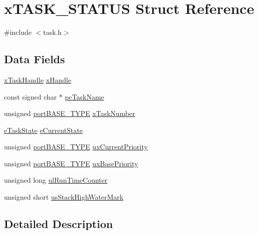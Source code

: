 \hypertarget{structxTASK__STATUS}{}\section{x\+T\+A\+S\+K\+\_\+\+S\+T\+A\+T\+US Struct Reference}
\label{structxTASK__STATUS}


{\ttfamily \#include $<$task.\+h$>$}

\subsection*{Data Fields}
\begin{DoxyCompactItemize}
\item 
\hyperlink{task_8h_a271ae40d5db07d928a113766505a0965}{x\+Task\+Handle} \hyperlink{structxTASK__STATUS_a16b862ad7f2460c2575d14350b5e7270}{x\+Handle}
\item 
const signed char $\ast$ \hyperlink{structxTASK__STATUS_a0b00a968685528cecb83b8d7f22b7863}{pc\+Task\+Name}
\item 
unsigned \hyperlink{portmacro_8h_a1ebe82d24d764ae4e352f7c3a9f92c01}{port\+B\+A\+S\+E\+\_\+\+T\+Y\+PE} \hyperlink{structxTASK__STATUS_a14a06c8bd78b7f60f9395593ac06b286}{x\+Task\+Number}
\item 
\hyperlink{task_8h_a1749369458e2282a22e862a619a3892c}{e\+Task\+State} \hyperlink{structxTASK__STATUS_a727e904e3afe49472b0fc6a4e96439cb}{e\+Current\+State}
\item 
unsigned \hyperlink{portmacro_8h_a1ebe82d24d764ae4e352f7c3a9f92c01}{port\+B\+A\+S\+E\+\_\+\+T\+Y\+PE} \hyperlink{structxTASK__STATUS_a381d967bd2222b5cb98efa708ae8a4d3}{ux\+Current\+Priority}
\item 
unsigned \hyperlink{portmacro_8h_a1ebe82d24d764ae4e352f7c3a9f92c01}{port\+B\+A\+S\+E\+\_\+\+T\+Y\+PE} \hyperlink{structxTASK__STATUS_a8bc6dc2f8978353bd749865e0df234bc}{ux\+Base\+Priority}
\item 
unsigned long \hyperlink{structxTASK__STATUS_a494d5201034e99551b51c94be3cfe34e}{ul\+Run\+Time\+Counter}
\item 
unsigned short \hyperlink{structxTASK__STATUS_a1563de12a37cce2c0cca1b7bdea81848}{us\+Stack\+High\+Water\+Mark}
\end{DoxyCompactItemize}


\subsection{Detailed Description}


